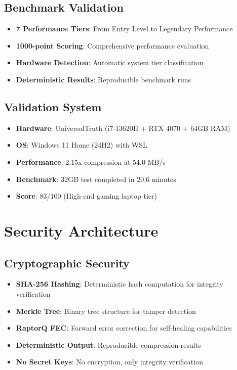 \documentclass[12pt,a4paper]{article}
\begin{document}
\subsection{Benchmark Validation}
\begin{itemize}
    \item \textbf{7 Performance Tiers}: From Entry Level to Legendary Performance
    \item \textbf{1000-point Scoring}: Comprehensive performance evaluation
    \item \textbf{Hardware Detection}: Automatic system tier classification
    \item \textbf{Deterministic Results}: Reproducible benchmark runs
\end{itemize}

\subsection{Validation System}
\begin{itemize}
    \item \textbf{Hardware}: UniversalTruth (i7-13620H + RTX 4070 + 64GB RAM)
    \item \textbf{OS}: Windows 11 Home (24H2) with WSL
    \item \textbf{Performance}: 2.15x compression at 54.0 MB/s
    \item \textbf{Benchmark}: 32GB test completed in 20.6 minutes
    \item \textbf{Score}: 83/100 (High-end gaming laptop tier)
\end{itemize}

\newpage

\section{Security Architecture}

\subsection{Cryptographic Security}
\begin{itemize}
    \item \textbf{SHA-256 Hashing}: Deterministic hash computation for integrity verification
    \item \textbf{Merkle Tree}: Binary tree structure for tamper detection
    \item \textbf{RaptorQ FEC}: Forward error correction for self-healing capabilities
    \item \textbf{Deterministic Output}: Reproducible compression results
    \item \textbf{No Secret Keys}: No encryption, only integrity verification
\end{itemize}
\end{document}
